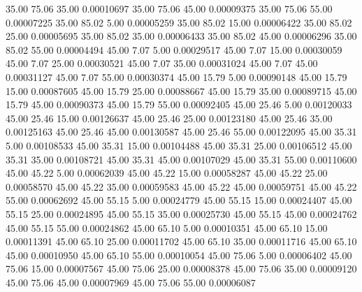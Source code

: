      35.00     75.06     35.00     0.00010697
     35.00     75.06     45.00     0.00009375
     35.00     75.06     55.00     0.00007225
     35.00     85.02      5.00     0.00005259
     35.00     85.02     15.00     0.00006422
     35.00     85.02     25.00     0.00005695
     35.00     85.02     35.00     0.00006433
     35.00     85.02     45.00     0.00006296
     35.00     85.02     55.00     0.00004494
     45.00      7.07      5.00     0.00029517
     45.00      7.07     15.00     0.00030059
     45.00      7.07     25.00     0.00030521
     45.00      7.07     35.00     0.00031024
     45.00      7.07     45.00     0.00031127
     45.00      7.07     55.00     0.00030374
     45.00     15.79      5.00     0.00090148
     45.00     15.79     15.00     0.00087605
     45.00     15.79     25.00     0.00088667
     45.00     15.79     35.00     0.00089715
     45.00     15.79     45.00     0.00090373
     45.00     15.79     55.00     0.00092405
     45.00     25.46      5.00     0.00120033
     45.00     25.46     15.00     0.00126637
     45.00     25.46     25.00     0.00123180
     45.00     25.46     35.00     0.00125163
     45.00     25.46     45.00     0.00130587
     45.00     25.46     55.00     0.00122095
     45.00     35.31      5.00     0.00108533
     45.00     35.31     15.00     0.00104488
     45.00     35.31     25.00     0.00106512
     45.00     35.31     35.00     0.00108721
     45.00     35.31     45.00     0.00107029
     45.00     35.31     55.00     0.00110600
     45.00     45.22      5.00     0.00062039
     45.00     45.22     15.00     0.00058287
     45.00     45.22     25.00     0.00058570
     45.00     45.22     35.00     0.00059583
     45.00     45.22     45.00     0.00059751
     45.00     45.22     55.00     0.00062692
     45.00     55.15      5.00     0.00024779
     45.00     55.15     15.00     0.00024407
     45.00     55.15     25.00     0.00024895
     45.00     55.15     35.00     0.00025730
     45.00     55.15     45.00     0.00024762
     45.00     55.15     55.00     0.00024862
     45.00     65.10      5.00     0.00010351
     45.00     65.10     15.00     0.00011391
     45.00     65.10     25.00     0.00011702
     45.00     65.10     35.00     0.00011716
     45.00     65.10     45.00     0.00010950
     45.00     65.10     55.00     0.00010054
     45.00     75.06      5.00     0.00006402
     45.00     75.06     15.00     0.00007567
     45.00     75.06     25.00     0.00008378
     45.00     75.06     35.00     0.00009120
     45.00     75.06     45.00     0.00007969
     45.00     75.06     55.00     0.00006087
